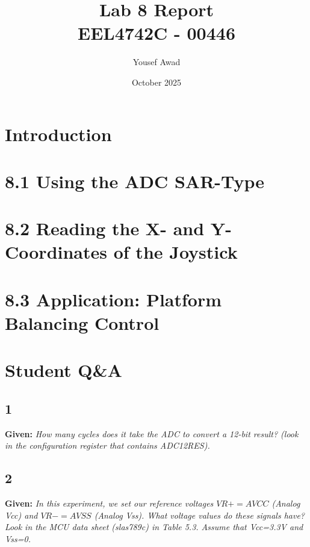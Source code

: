 \documentclass{article}
\title{Lab 8 Report \\ \large EEL4742C - 00446}
\author{Yousef Awad}
\date{October 2025}
\begin{document}
\maketitle
\tableofcontents
\newpage

\section{Introduction}

\section{8.1 Using the ADC SAR-Type}

\pagebreak

\section{8.2 Reading the X- and Y- Coordinates of the Joystick}

\pagebreak

\section{8.3 Application: Platform Balancing Control}

\pagebreak

\section{Student Q\&A}
\subsection{1}
\textbf{Given:} \textit{How many cycles does it take the ADC to convert a 12-bit result? (look in the configuration register that contains ADC12RES).}

\subsection{2}
\textbf{Given:} \textit{In this experiment, we set our reference voltages $VR+ = AV CC$ (Analog Vcc) and $VR- = AV SS$ (Analog Vss). What voltage values do these signals have? Look in the MCU data sheet (slas789c) in Table 5.3. Assume that Vcc=3.3V and Vss=0.}
\end{document}
